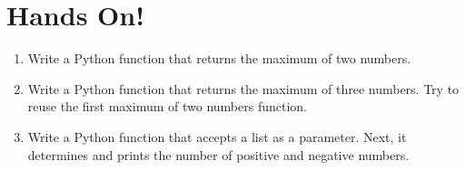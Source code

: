\documentclass[aspectratio=1610,slidestop]{beamer}
\begin{document}
\begin{pframe}
 \begin{center}
  
 \end{center}
\end{pframe}


\section{Hands On!}

\begin{pframe}
 \vspace{-0.5cm}
 \begin{enumerate}
  \item Write a Python function that returns the maximum of two numbers.
  \item Write a Python function that returns the maximum of three numbers.
  Try to reuse the first maximum of two numbers function.
  \item Write a Python function that accepts a list as a parameter.
  Next, it determines and prints the number of positive and negative numbers.
 \end{enumerate}
\end{pframe}


\end{document}
